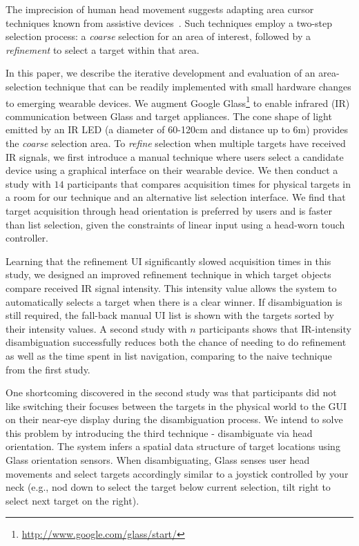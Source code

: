The imprecision of human head movement suggests adapting area cursor techniques known from assistive devices~\cite{kabbash1995prince,worden1997making,findlater2010enhanced}. Such techniques employ a two-step selection process: a {\em coarse} selection for an area of interest, followed by a {\em refinement} to select a target within that area.

In this paper, we describe the iterative development and evaluation of an area-selection technique that can be readily implemented with small hardware changes to emerging wearable devices. We augment Google Glass\footnote{\url{http://www.google.com/glass/start/}} to enable infrared (IR) communication between Glass and target appliances. The cone shape of light emitted by an IR LED (a diameter of 60-120cm and distance up to 6m) provides the {\em coarse} selection area. To {\em refine} selection when multiple targets have received IR signals, we first introduce a manual technique where users select a candidate device using a graphical interface on their wearable device.  We then conduct a study with $14$ participants that compares acquisition times for physical targets in a room for our technique and an alternative list selection interface. We find that target acquisition through head orientation is preferred by users and is faster than list selection, given the constraints of linear input using a head-worn touch controller. 

Learning that the refinement UI significantly slowed acquisition times in this study, we designed an improved refinement technique in which target objects compare received IR signal intensity. This intensity value allows the system to automatically selects a target when there is a clear winner. If disambiguation is still required, the fall-back manual UI list is shown with the targets sorted by their intensity values. A second study with $n$ participants shows that IR-intensity disambiguation successfully reduces both the chance of needing to do refinement as well as the time spent in list navigation, comparing to the naive technique from the first study.

One shortcoming discovered in the second study was that participants did not like switching their focuses between the targets in the physical world to the GUI on their near-eye display during the disambiguation process. We intend to solve this problem by introducing the third technique - disambiguate via head orientation. The system infers a spatial data structure of target locations using Glass orientation sensors. When disambiguating, Glass senses user head movements and select targets accordingly similar to a joystick controlled by your neck (e.g., nod down to select the target below current selection, tilt right to select next target on the right).

